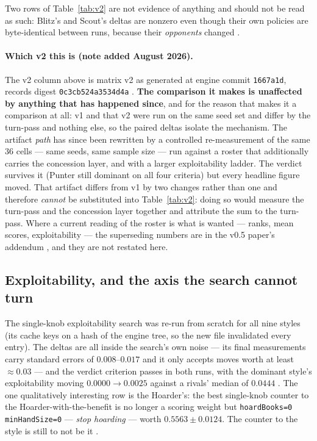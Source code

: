 \documentclass[11pt]{article}
\newcommand{\code}[1]{\texttt{#1}}
\begin{document}
Two rows of Table~\ref{tab:v2} are not evidence of anything and should not be
read as such: Blitz's and Scout's deltas are nonzero even though their own
policies are byte-identical between runs, because their \emph{opponents}
changed \cite{styles}.

\paragraph{Which v2 this is (note added August 2026).} The v2 column above is
matrix v2 as generated at engine commit \code{1667a1d}, records digest
\code{0c3cb524a3534d4a} \cite{artifacts}. \textbf{The comparison it makes is
unaffected by anything that has happened since}, and for the reason that makes
it a comparison at all: v1 and that v2 were run on the same seed set and
differ by the turn-pass and nothing else, so the paired deltas isolate the
mechanism. The artifact \emph{path} has since been rewritten by a controlled
re-measurement of the same 36 cells --- same seeds, same sample size --- run
against a roster that additionally carries the concession layer, and with a
larger exploitability ladder. The verdict survives it (Punter still dominant
on all four criteria) but every headline figure moved. That artifact differs
from v1 by two changes rather than one and therefore \emph{cannot} be
substituted into Table~\ref{tab:v2}: doing so would measure the turn-pass and
the concession layer together and attribute the sum to the turn-pass. Where a
current reading of the roster is what is wanted --- ranks, mean scores,
exploitability --- the superseding numbers are in the v0.5 paper's addendum
\cite{v05}, and they are not restated here.

\subsection{Exploitability, and the axis the search cannot turn}
\label{sec:exploit}

The single-knob exploitability search was re-run from scratch for all nine
styles (its cache keys on a hash of the engine tree, so the new file
invalidated every entry). The deltas are all inside the search's own noise
--- its final measurements carry standard errors of $0.008$--$0.017$ and it
only accepts moves worth at least $\approx 0.03$ --- and the verdict criterion
passes in both runs, with the dominant style's exploitability moving
$0.0000 \to 0.0025$ against a rivals' median of $0.0444$ \cite{styles}. The
one qualitatively interesting row is the Hoarder's: the best single-knob
counter to the Hoarder-with-the-benefit is no longer a scoring weight but
\code{hoardBooks=0 minHandSize=0} --- \emph{stop hoarding} --- worth
$0.5563 \pm 0.0124$. The counter to the style is still to not be it
\cite{styles,artifacts}.
\end{document}
